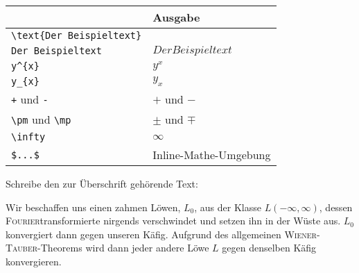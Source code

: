 \documentclass["WS\space 16-17\space -\space LaTeX-Kurs\space -\space Praesentation\space -\space 1.tex"]{subfiles}
\begin{document}
\begin{frame}[fragile]
	\begin{center}
		\begin{tabular}{ll}
			\toprule
			\color{math-cmd}{Mathe}\color{black}{-Befehl}									&	Ausgabe					\\ \midrule
			\lstinline|\text{Der Beispieltext}|		&	\text{Der Beispieltext}	\\
			\lstinline|Der Beispieltext|			&	$Der Beispieltext$		\\
			\lstinline|y^{x}|						&	$y^{x}$					\\
			\lstinline|y_{x}|						&	$y_{x}$					\\
			\lstinline|+|	und 	\lstinline|-|	&	$+$	und $-$				\\
			\lstinline|\pm| und \lstinline|\mp|		&	$\pm$ und $\mp$			\\
			\lstinline|\infty|						&	$\infty$			    \\ \midrule
			\lstinline|$...$|						&	Inline-Mathe-Umgebung   \\
			\bottomrule
		\end{tabular}
	\end{center}
	\pause\btVFill
	\Aufgabee
		Schreibe den zur Überschrift  gehörende Text:
	\begin{outputbox}
		Wir beschaffen uns einen zahmen Löwen, $L_0$, aus der Klasse $L(- \infty, \infty)$, dessen \textsc{Fourier}transformierte nirgends verschwindet und setzen ihn in der Wüste aus. $L_0$ konvergiert dann gegen unseren Käfig. Aufgrund des allgemeinen \textsc{Wiener}-\textsc{Tauber}-Theorems wird dann jeder andere Löwe $L$ gegen denselben Käfig konvergieren.
	\end{outputbox}
	\vspace{0.3cm}
\end{frame}
\end{document}
